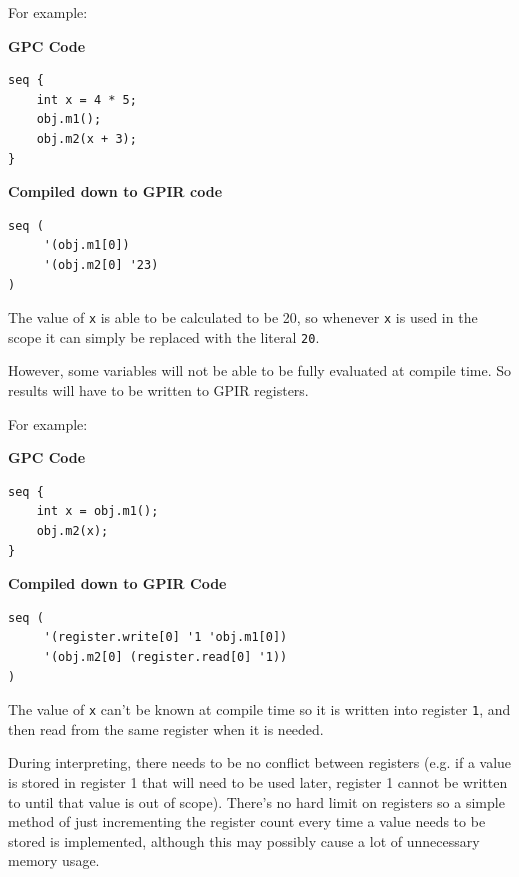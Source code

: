 For example:

\begin{center}{\textbf{GPC Code}}
\end{center}

\begin{lstlisting}[style=myGPC, frame=single]
seq {
    int x = 4 * 5;
    obj.m1();
    obj.m2(x + 3);
}
\end{lstlisting}

\begin{center}{\textbf{Compiled down to GPIR code}}
\end{center}

\begin{lstlisting}[style=myGPIR, frame=single]
seq (
     '(obj.m1[0]) 
     '(obj.m2[0] '23)
)
\end{lstlisting}

The value of \texttt{x} is able to be calculated to be 20, so whenever
\texttt{x} is used in the scope it can simply be replaced with the literal \texttt{20}.

However, some variables will not be able to be fully evaluated at compile time.
So results will have to be written to GPIR registers.

For example:

\begin{center}{\textbf{GPC Code}}
\end{center}
\begin{lstlisting}[style=myGPC, frame=single]
seq {
    int x = obj.m1();
    obj.m2(x);
}
\end{lstlisting}

\begin{center}{\textbf{Compiled down to GPIR Code}}
\end{center}
\begin{lstlisting}[style=myGPIR, frame=single]
seq (
     '(register.write[0] '1 'obj.m1[0]) 
     '(obj.m2[0] (register.read[0] '1))
)
\end{lstlisting}

The value of \texttt{x} can't be known at compile time so it is written into register \texttt{1},
and then read from the same register when it is needed.

During interpreting, there needs to be no conflict between registers (e.g. if a value
is stored in register 1 that will need to be used later, register 1 cannot be written to
until that value is out of scope). There's no hard limit on registers so a simple
method of just incrementing the register count every time a value needs to be stored
is implemented, although this may possibly cause a lot of unnecessary memory usage.

